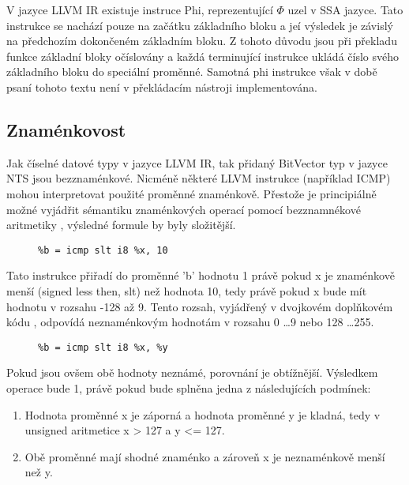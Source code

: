 \documentclass[10pt,a4paper,notitlepage]{report}
\begin{document}
V jazyce LLVM IR existuje instruce Phi, reprezentující $\Phi$ uzel  v SSA jazyce. Tato instrukce se nachází pouze na začátku základního bloku a jeí výsledek je závislý na předchozím dokončeném základním bloku. Z tohoto důvodu jsou při překladu funkce základní bloky očíslovány a každá terminující instrukce ukládá číslo svého základního bloku do speciální proměnné. Samotná phi instrukce však v době psaní tohoto textu není v překládacím nástroji implementována.

\subsection{Znaménkovost}
Jak číselné datové typy v jazyce LLVM IR, tak přidaný BitVector typ v jazyce NTS jsou bezznaménkové. Nicméně některé LLVM instrukce (například ICMP) mohou interpretovat použité proměnné znaménkově. Přestože je principiálně možné vyjádřit sémantiku znaménkových operací pomocí bezznamnékové aritmetiky , výsledné formule by byly složitější. 
\begin{figure}[h!]
\begin{lstlisting}
%b = icmp slt i8 %x, 10
\end{lstlisting}
\end{figure}
Tato instrukce přiřadí do proměnné 'b' hodnotu 1 právě pokud x je znaménkově menší (signed less then, slt) než hodnota 10, tedy právě pokud x bude mít hodnotu v rozsahu -128 až 9. Tento rozsah, vyjádřený v dvojkovém doplňkovém kódu , odpovídá neznaménkovým hodnotám v rozsahu 0 \ldots 9 nebo 128 \ldots 255. 

\begin{figure}[h!]
\begin{lstlisting}
%b = icmp slt i8 %x, %y
\end{lstlisting}
\end{figure}

Pokud jsou ovšem obě hodnoty neznámé, porovnání je obtížnější. Výsledkem operace bude 1, právě pokud bude splněna jedna z následujících podmínek:

\begin{enumerate}
\item Hodnota proměnné x je záporná a hodnota proměnné y je kladná, tedy v unsigned aritmetice x > 127 a y <= 127.
\item Obě proměnné mají shodné znaménko a zároveň x je neznaménkově menší než y.
\end{enumerate}
\end{document}
